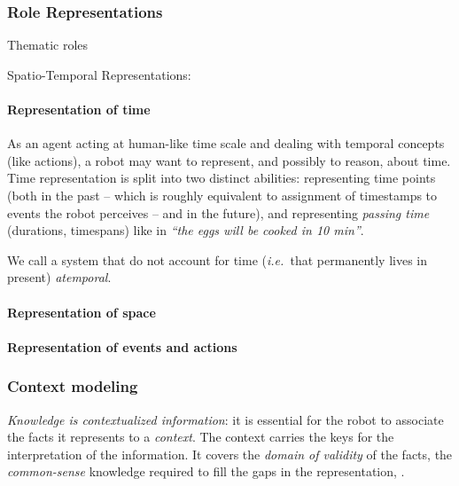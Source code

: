 \documentclass[a4paper, twocolumn]{article}
\newcommand{\ie}{{\textit{i.e.\ }}}
\begin{document}
\subsubsection{Role Representations}

Thematic roles

Spatio-Temporal Representations:

\paragraph{Representation of time}

As an agent acting at human-like time scale and dealing with temporal concepts
(like actions), a robot may want to represent, and possibly to reason, about
time. Time representation is split into two distinct abilities: representing
time points (both in the past -- which is roughly equivalent to assignment of
timestamps to events the robot perceives -- and in the future), and
representing \emph{passing time} (durations, timespans) like in \emph{``the
eggs will be cooked in 10 min''}.


We call a system that do not account for time (\ie that permanently lives in
present) \emph{atemporal}.

\paragraph{Representation of space}

\paragraph{Representation of events and actions}

\subsubsection{Context modeling}

\emph{Knowledge is contextualized information}: it is essential for the robot to associate the facts it
represents to a \emph{context}. The context carries the keys for the
interpretation of the information. It covers the \emph{domain of validity} of
the facts, the \emph{common-sense} knowledge required to fill the gaps in the
representation, .
\end{document}

